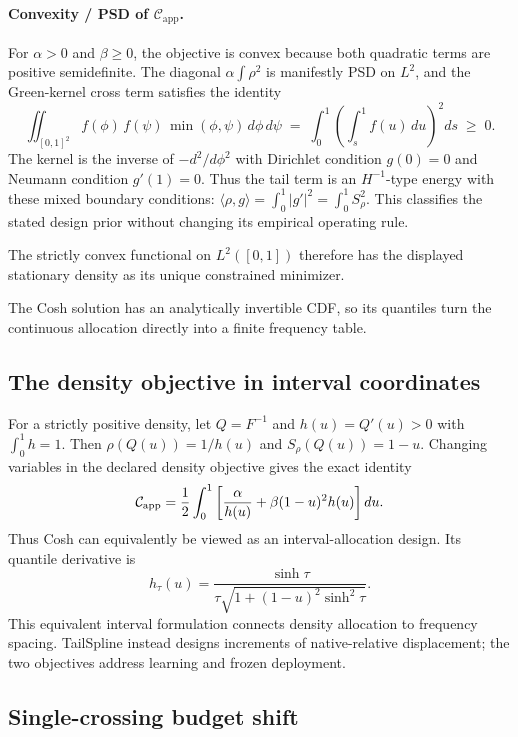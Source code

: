 \paragraph{Convexity / PSD of $\mathcal{C}_{\mathrm{app}}$.} For $\alpha{>}0$ and $\beta{\geq}0$, the objective is convex because both quadratic terms are positive semidefinite. The diagonal $\alpha{\int}\rho^2$ is manifestly PSD on $L^2$, and the Green-kernel cross term satisfies the identity
\begin{equation}
\iint_{[0,1]^2} f(\phi)\,f(\psi)\,\min(\phi,\psi)\,d\phi\,d\psi \;=\; \int_0^1 \!\left(\int_s^1 f(u)\,du\right)^{\!2}\!ds \;\geq\; 0.
\label{eq:min-kernel-psd}
\end{equation}
The kernel is the inverse of $-d^2/d\phi^2$ with Dirichlet condition $g(0)=0$ and Neumann condition $g'(1)=0$. Thus the tail term is an $H^{-1}$-type energy with these mixed boundary conditions: $\langle\rho,g\rangle=\int_0^1|g'|^2=\int_0^1S_\rho^2$. This classifies the stated design prior without changing its empirical operating rule.

The strictly convex functional on $L^2([0,1])$ therefore has the displayed
stationary density as its unique constrained minimizer.

The Cosh solution has an analytically invertible CDF, so its quantiles turn
the continuous allocation directly into a finite frequency table.

\FloatBarrier
\subsection{The density objective in interval coordinates}
\label{sec:cosh-gap-form}
For a strictly positive density, let $Q=F^{-1}$ and $h(u)=Q'(u)>0$ with $\int_0^1h=1$. Then $\rho(Q(u))=1/h(u)$ and $S_\rho(Q(u))=1-u$. Changing variables in the declared density objective gives the exact identity
\[
\mathcal C_{\rm app}=\frac12\int_0^1\left[\frac\alpha{h(u)}+\beta(1-u)^2h(u)\right]du.
\]
Thus Cosh can equivalently be viewed as an interval-allocation design. Its quantile derivative is
\[
h_\tau(u)=\frac{\sinh\tau}{\tau\sqrt{1+(1-u)^2\sinh^2\tau}}.
\]
This equivalent interval formulation connects density allocation to frequency spacing. TailSpline instead designs increments of native-relative displacement; the two objectives address learning and frozen deployment.

\subsection{Single-crossing budget shift}
\label{sec:budget-crossing-proof}

